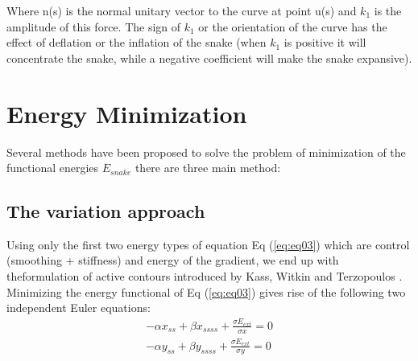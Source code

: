 \hspace{-0.6cm}Where n(s) is the normal unitary vector to the curve at point u(s) and $k_1$ is the
amplitude of this force. The sign of $k_1$ or the orientation of the curve has the
effect of deflation or the inflation of the snake \cite{2.5} (when $k_1$ is positive it will
concentrate the snake, while a negative coefficient will make the snake
expansive).
\section{Energy Minimization}\label{sec:energy-minimization}

Several methods have been proposed to solve the problem of minimization of
the functional energies $E_{snake}$ there are three main method:

\subsection{The variation approach}\label{subsec:the-variation-approach}
Using only the first two energy types of equation Eq (\ref{eq:eq03}) which are
control (smoothing + stiffness) and energy of the gradient, we end up with
theformulation of active contours introduced by Kass, Witkin and
Terzopoulos \cite{2.1}.\\
Minimizing the energy functional of Eq (\ref{eq:eq03}) gives rise of the following two
independent Euler equations:
\begin{equation}
        \begin{matrix}
                - \alpha x_{ss} + \beta x_{ssss} + \frac{\sigma E_{ext}}{\sigma x} = 0 \\
                - \alpha y_{ss} + \beta y_{ssss} + \frac{\sigma E_{ext}}{\sigma y} = 0
        \end{matrix}
        \label{eq:eq08}
\end{equation}

